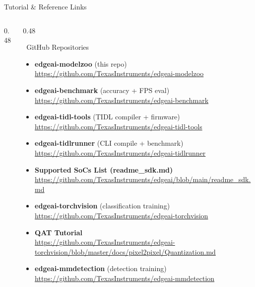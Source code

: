 \documentclass[aspectratio=169,12pt]{beamer}
\begin{document}
\begin{frame}{Tutorial \& Reference Links}
\begin{columns}[T]
\begin{column}{0.48\textwidth}
    \end{column}

    \begin{column}{0.48\textwidth}

      \begin{exampleblock}{\faGithub~GitHub Repositories}
        \begin{itemize}\scriptsize
          \item \textbf{edgeai-modelzoo} (this repo)\\
                {\tiny\url{https://github.com/TexasInstruments/edgeai-modelzoo}}
          \item \textbf{edgeai-benchmark} (accuracy + FPS eval)\\
                {\tiny\url{https://github.com/TexasInstruments/edgeai-benchmark}}
          \item \textbf{edgeai-tidl-tools} (TIDL compiler + firmware)\\
                {\tiny\url{https://github.com/TexasInstruments/edgeai-tidl-tools}}
          \item \textbf{edgeai-tidlrunner} (CLI compile + benchmark)\\
                {\tiny\url{https://github.com/TexasInstruments/edgeai-tidlrunner}}
          \item \textbf{Supported SoCs List (readme\_sdk.md)}\\
                {\tiny\url{https://github.com/TexasInstruments/edgeai/blob/main/readme_sdk.md}}
          \item \textbf{edgeai-torchvision} (classification training)\\
                {\tiny\url{https://github.com/TexasInstruments/edgeai-torchvision}}
          \item \textbf{QAT Tutorial}\\
                {\tiny\url{https://github.com/TexasInstruments/edgeai-torchvision/blob/master/docs/pixel2pixel/Quantization.md}}
          \item \textbf{edgeai-mmdetection} (detection training)\\
                {\tiny\url{https://github.com/TexasInstruments/edgeai-mmdetection}}
        \end{itemize}
      \end{exampleblock}

    \end{column}
  \end{columns}
\end{frame}
\end{document}
